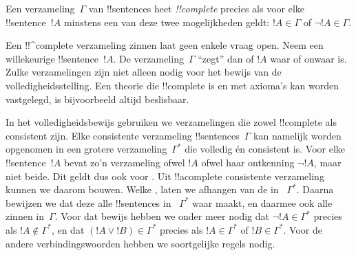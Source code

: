 \documentclass[openany]{memoir}
\begin{document}



      {}
      {}
      

\begin{defn}
 Een verzameling~$\Gamma$ van !!{sentence}s heet
\emph{!!{complete}} precies als voor elke !!{sentence}~$!A$ minstens een
van deze twee mogelijkheden geldt: $!A \in \Gamma$ of
$\lnot !A \in \Gamma$.
\end{defn}

\begin{explain}
Een !!^{complete} verzameling zinnen laat geen enkele vraag open. Neem
een willekeurige !!{sentence}~$!A$. De verzameling~$\Gamma$ ``zegt'' dan
of $!A$ waar of onwaar is. Zulke verzamelingen zijn niet alleen nodig
voor het bewijs van de volledigheidsstelling. Een theorie die !!{complete}
is en met axioma's kan worden vastgelegd, is bijvoorbeeld altijd
beslisbaar.
\end{explain}

\begin{explain}
In het volledigheidsbewijs gebruiken we verzamelingen die zowel
!!{complete} als consistent zijn. Elke consistente verzameling
!!{sentence}s~$\Gamma$ kan namelijk worden opgenomen in een grotere
verzameling~$\Gamma^*$ die volledig én consistent is. Voor elke
!!{sentence}~$!A$ bevat zo'n verzameling ofwel $!A$ ofwel haar ontkenning
$\lnot !A$, maar niet beide. Dit geldt dus ook voor
. Uit
!!a{complete} consistente verzameling kunnen we daarom
 bouwen. Welke
, laten we afhangen van de
 in
~$\Gamma^*$. Daarna bewijzen we dat deze
 alle !!{sentence}s in
~$\Gamma^*$ waar maakt, en daarmee ook alle zinnen in~$\Gamma$. Voor dat
bewijs hebben we onder meer nodig dat $\lnot !A \in \Gamma^*$ precies
als $!A \notin \Gamma^*$, en dat $(!A \lor !B) \in \Gamma^*$ precies
als $!A \in \Gamma^*$ of $!B \in \Gamma^*$. Voor de andere
verbindingswoorden hebben we soortgelijke regels nodig.
\end{explain}
\end{document}
